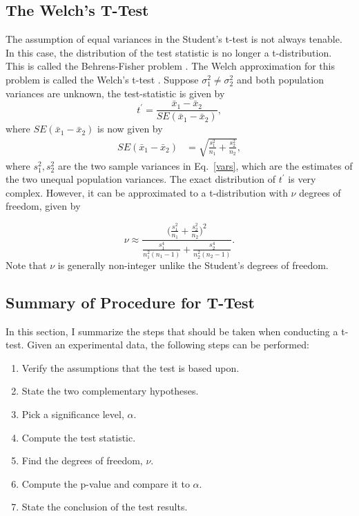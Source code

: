 \documentclass[10pt, aps,twocolumn, superscriptaddress, nofootinbib]{revtex4-2}
\begin{document}
\subsection{The Welch's T-Test}

The assumption of equal variances in the Student's t-test is not always tenable. In this case, the distribution of the test statistic is no longer a t-distribution. This is called the Behrens-Fisher problem \cite{s3b}. The Welch approximation for this problem is called the Welch's t-test \cite{s3c}. Suppose $\sigma_1^2\neq \sigma_2^2$ and both population variances are unknown, the test-statistic is given by
\begin{equation}
 	t^\prime =\frac{\bar{x}_1 -\bar{x}_2}{SE({\bar{x}_1 -\bar{x}_2})},
 	\label{eqn8a}
 \end{equation}
 where  $SE({\bar{x}_1 -\bar{x}_2})$ is now given by
  \begin{align}
 	SE({\bar{x}_1 -\bar{x}_2}) &= \sqrt{\frac{s_{1}^2}{n_1} + \frac{s_{2}^2}{n_2}},
 	\label{eqn99}
 \end{align} 
where  $s_1^2, s_2^2$ are the two sample variances in Eq.~\eqref{vars}, which are the estimates of the two unequal  population variances. The exact distribution of $t^\prime$ is  very complex. However,   it can be approximated to a t-distribution with $\nu$ degrees of freedom,  given by

\begin{equation}
	\nu \approx \frac{\Big(\frac{s_1^2}{n_1} + \frac{s_2^2}{n_2}\Big)^2}{\frac{s_1^4}{n_1^2(n_1-1)} + \frac{s_2^4}{n_2^2(n_2-1)}}.
\end{equation}
Note that $\nu$ is generally non-integer unlike the Student's degrees of freedom. 

\subsection{Summary of Procedure for T-Test }
In this section, I summarize the steps that should be taken when conducting a t-test. Given an experimental data, the following steps can be performed:
\begin{enumerate}

\item Verify the assumptions that the test is based upon.
\item State the two complementary hypotheses.
\item Pick a significance level, $\alpha$.
\item Compute the test statistic.
\item  Find the degrees of freedom, $\nu$.
\item Compute the p-value and compare it to  $\alpha$.
\item State the conclusion of the test results.
\end{enumerate}
\end{document}
